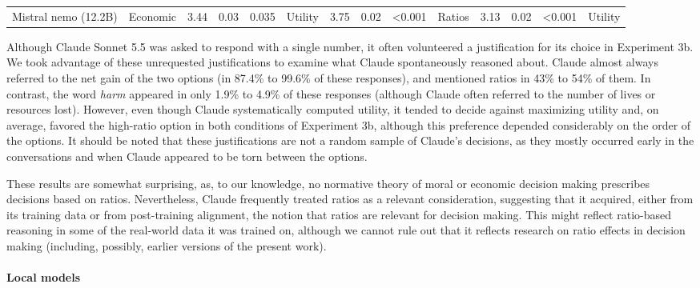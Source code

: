 \documentclass[
]{article}
\begin{document}
\begin{landscape}
\begin{longtable}[t]{llrrllrrllrrll}
\hspace{1em}Mistral nemo (12.2B) & Economic & 3.44 & 0.03 & 0.035 & Utility & 3.75 & 0.02 & <0.001 & Ratios & 3.13 & 0.02 & <0.001 & Utility\\*
\end{longtable}
\endgroup{}
\end{landscape}

Although Claude Sonnet 5.5 was asked to respond with a single number, it often volunteered a justification for its choice in Experiment 3b. We took advantage of these unrequested justifications to examine what Claude spontaneously reasoned about. Claude almost always referred to the net gain of the two options (in 87.4\% to 99.6\% of these responses), and mentioned ratios in 43\% to 54\% of them. In contrast, the word \emph{harm} appeared in only 1.9\% to 4.9\% of these responses (although Claude often referred to the number of lives or resources lost). However, even though Claude systematically computed utility, it tended to decide against maximizing utility and, on average, favored the high-ratio option in both conditions of Experiment 3b, although this preference depended considerably on the order of the options. It should be noted that these justifications are not a random sample of Claude's decisions, as they mostly occurred early in the conversations and when Claude appeared to be torn between the options.

These results are somewhat surprising, as, to our knowledge, no normative theory of moral or economic decision making prescribes decisions based on ratios. Nevertheless, Claude frequently treated ratios as a relevant consideration, suggesting that it acquired, either from its training data or from post-training alignment, the notion that ratios are relevant for decision making. This might reflect ratio-based reasoning in some of the real-world data it was trained on, although we cannot rule out that it reflects research on ratio effects in decision making (including, possibly, earlier versions of the present work).

\clearpage

\paragraph{Local models}\label{local-models-1}
\end{document}
